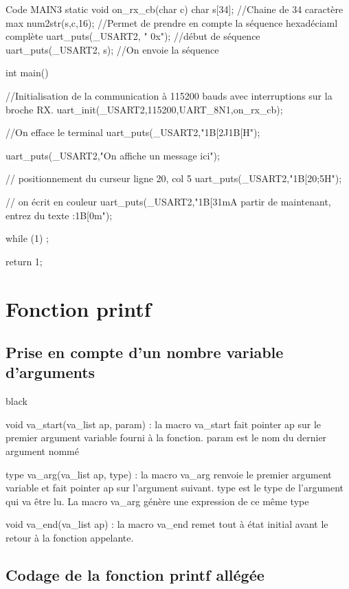 \begin{Cpp}{Code MAIN3}
static void on_rx_cb(char c)
{
	char  s[34];				//Chaine de 34 caractère max
	num2str(s,c,16);			//Permet de prendre en compte la séquence hexadéciaml complète
	uart_puts(_USART2, " 0x");	//début de séquence
	uart_puts(_USART2, s);		//On envoie la séquence
}


int main()
{
	//Initialisation de la communication à 115200 bauds avec interruptions sur la broche RX.
	uart_init(_USART2,115200,UART_8N1,on_rx_cb);

	//On efface le terminal
	uart_puts(_USART2,"\x1B[2J\x1B[H");

	uart_puts(_USART2,"On affiche un message ici");

	// positionnement du curseur ligne 20, col 5
	uart_puts(_USART2,"\x1B[20;5H");

	// on écrit en couleur
	uart_puts(_USART2,"\x1B[31mA partir de maintenant, entrez du texte :\x1B[0m");

	while (1) ;

	return 1;
}
\end{Cpp}
\chapter{Fonction printf}

\section{Prise en compte d'un nombre variable d'arguments}

\begin{items}{black}{\Bullet}

\item void va\_start(va\_list ap, param) : la macro va\_start fait pointer ap
sur le premier argument variable fourni à la fonction. param est le nom du
dernier argument nommé

\item type va\_arg(va\_list ap, type) : la macro va\_arg renvoie le premier
argument variable et fait pointer ap sur l'argument suivant. type est le type de
l'argument qui va être lu. La macro va\_arg génère une expression de ce même
type
\item void va\_end(va\_list ap) : la macro va\_end remet tout à état initial avant
le retour à la fonction appelante.
\end{items}

\section{Codage de la fonction printf allégée}


